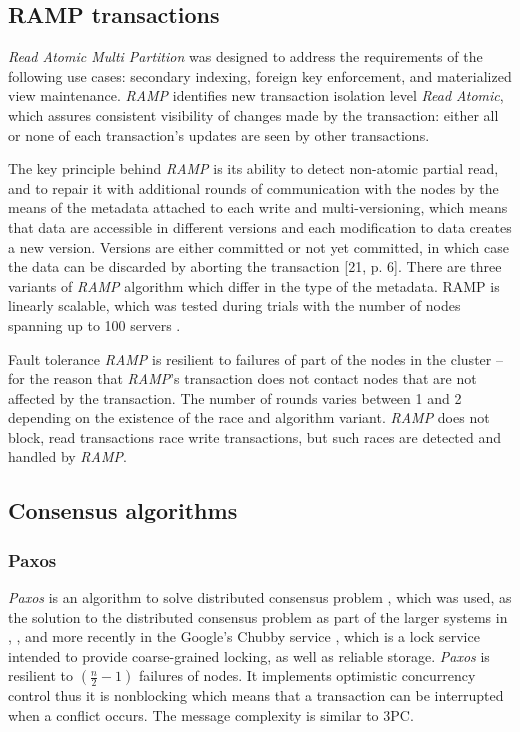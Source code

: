 \documentclass[runningheads,a4paper]{llncs}
\newcommand{\paxos}{\emph{Paxos}\xspace}
\begin{document}
\subsection{RAMP transactions} 
\emph{Read Atomic Multi Partition} \cite{Bailis:2014} was designed to address the requirements of the following use cases: secondary indexing, foreign key enforcement, and materialized view maintenance. \emph{RAMP} identifies new transaction isolation level \emph{Read Atomic}, which assures consistent visibility of changes made by the transaction: either all or none of each transaction’s updates are seen by other transactions.

The key principle behind \emph{RAMP} is its ability to detect non-atomic partial read, and to repair it with additional rounds of communication with the nodes by the means of the metadata attached to each write and multi-versioning, which means that data are accessible in different versions and each modification to data creates a new version. Versions are either committed or not yet committed, in which case the data can be discarded by aborting the transaction [21, p. 6]. There are three variants of \emph{RAMP} algorithm which differ in the type of the metadata. RAMP is linearly scalable, which was tested during trials with the number of nodes spanning up to 100 servers \cite[p. 10]{Bailis:2014}.

Fault tolerance \emph{RAMP} is resilient to failures of part of the nodes in the cluster – for the reason that \emph{RAMP}’s transaction does not contact nodes that are not affected by the transaction. The number of rounds varies between 1 and 2 depending on the existence of the race and algorithm variant. \emph{RAMP} does not block, read transactions race write transactions, but such races are detected and handled by \emph{RAMP}.

\subsection{Consensus algorithms}

\subsubsection{Paxos}

\paxos is an algorithm to solve distributed consensus problem \cite{Lamport1998partTimeParliment} \cite{lamport2001paxosMadeSimple}, which was used, as the solution to the distributed consensus problem as part of the larger systems in \cite{chandra2007PaxosMadeLive}, \cite{lampson1996build}, and more recently in the Google's Chubby service \cite{burrows2006chubby}, which is a lock service intended to provide coarse-grained locking, as well as reliable storage. \paxos is resilient to $(\frac{n}{2}-1)$ failures of nodes. It implements optimistic concurrency control thus it is nonblocking which means that a transaction can be interrupted when a conflict occurs. The message complexity is similar to 3PC.
\end{document}
